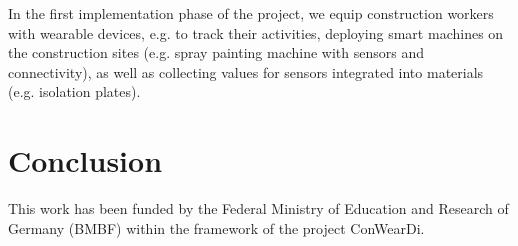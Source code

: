 In the first implementation phase of the project, we equip construction workers with wearable devices, e.g. to track their activities, deploying smart machines on the construction sites (e.g. spray painting machine with sensors and connectivity), as well as collecting values for sensors integrated into materials (e.g. isolation plates).

\section{Conclusion}


\begin{acks}
  This work has been funded by the Federal Ministry of Education and Research of Germany (BMBF) within the framework of the project ConWearDi.
\end{acks}
